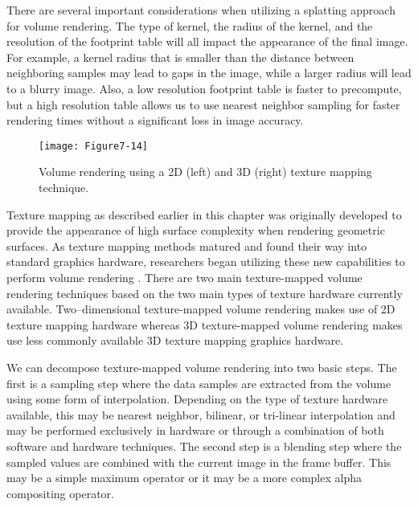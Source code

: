 There are several important considerations when utilizing a splatting approach for volume rendering. The type of kernel, the radius of the kernel, and the resolution of the footprint table will all impact the appearance of the final image. For example, a kernel radius that is smaller than the distance between neighboring samples may lead to gaps in the image, while a larger radius will lead to a blurry image. Also, a low resolution footprint table is faster to precompute, but a high resolution table allows us to use nearest neighbor sampling for faster rendering times without a significant loss in image accuracy.

\begin{figure}[!htb]
	\texttt{[image: Figure7-14]}
	\caption{Volume rendering using a 2D (left) and 3D (right) texture mapping technique.}\label{fig:Figure7-14}
\end{figure}

Texture mapping as described earlier in this chapter was originally developed to provide the appearance of high surface complexity when rendering geometric surfaces. As texture mapping methods matured and found their way into standard graphics hardware, researchers began utilizing these new capabilities to perform volume rendering \cite{Cabral94}. There are two main texture-mapped volume rendering techniques based on the two main types of texture hardware currently available. Two--dimensional texture-mapped volume rendering makes use of 2D texture mapping hardware whereas 3D texture-mapped volume rendering makes use less commonly available 3D texture mapping graphics hardware.

We can decompose texture-mapped volume rendering into two basic steps. The first is a sampling step where the data samples are extracted from the volume using some form of interpolation. Depending on the type of texture hardware available, this may be nearest neighbor, bilinear, or tri-linear interpolation and may be performed exclusively in hardware or through a combination of both software and hardware techniques. The second step is a blending step where the sampled values are combined with the current image in the frame buffer. This may be a simple maximum operator or it may be a more complex alpha compositing operator.

